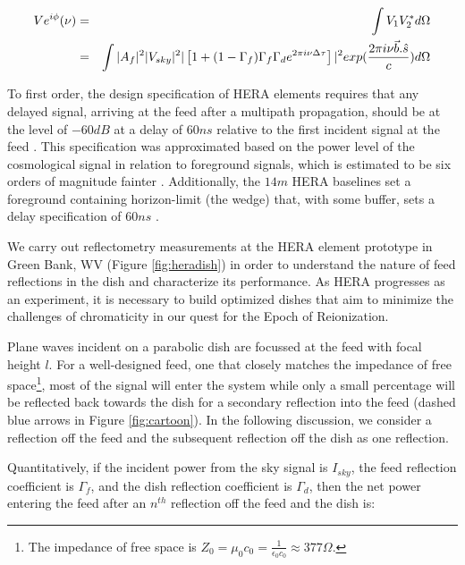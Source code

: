 \documentclass[12pt,preprint]{aastex}
\begin{document}
\begin{eqnarray}
V e^{i\phi}(\nu) & = & \int V_{1}V_{2}^{*} d\Omega \nonumber\\
		        & = & \int |A_{f}|^{2}|V_{sky}|^{2} |\left [ 1+(1-\Gamma_{f}) \Gamma_{f} \Gamma_{d} e^{2\pi i\nu \Delta \tau}  \right]|^{2} exp({2\pi i \nu \vec{b}.\hat{s} \over c} ) d\Omega
\label{eq6}		        
\end{eqnarray}


To first order, the design specification of HERA elements requires that any
delayed signal, arriving at the feed after a multipath propagation, should be
at the level of $-60dB$ at a delay of $60ns$ relative to the first incident
signal at the feed \citep{parsons_deboer_memo}. This specification was
approximated based on the power level of the cosmological signal in relation to
foreground signals, which is estimated to be six orders of magnitude fainter
\citep{santos_et_al2005,ali_et_al2008,deoliveira2008,jelic_et_al2008,bernardi_et_al2009,bernardi_et_al2010,ghosh_et_al2011}.
Additionally, the $14m$ HERA baselines set a foreground containing
horizon-limit (the wedge) that, with some buffer, sets a delay specification of
$60ns$
\citep{parsons_et_al2012b,vedantham_et_al2012,nithya_et_al2013,liu_et_al2014a,liu_et_al2014b}.

We carry out reflectometry measurements at the HERA element prototype in Green
Bank, WV (Figure \ref{fig:heradish}) in order to understand the nature of feed
reflections in the dish and characterize its performance. As HERA progresses as
an experiment, it is necessary to build optimized dishes that aim to minimize the
challenges of chromaticity in our quest for the Epoch of Reionization.



Plane waves incident on a parabolic dish
are focussed at the feed with focal height $l$. For a well-designed feed, one
that closely matches the impedance of free space\footnote{The impedance of free space
is $Z_{0} = \mu_{0}c_{0} = \frac{1}{\epsilon_{0}c_{0}} \approx 377\Omega $.},
most of the signal will enter the system while only
a small percentage will be reflected back towards the dish for a secondary
reflection into the feed (dashed blue arrows in Figure \ref{fig:cartoon}). In the
following discussion, we consider a reflection off the feed and the
subsequent reflection off the dish as one reflection.

Quantitatively, if the incident power from the sky signal is $I_{sky}$, the feed
reflection coefficient is $\Gamma_{f}$, and the dish reflection
coefficient is $\Gamma_{d}$, then the net power entering the feed after an
$n^{th}$ reflection off the feed and the dish is:
\end{document}
